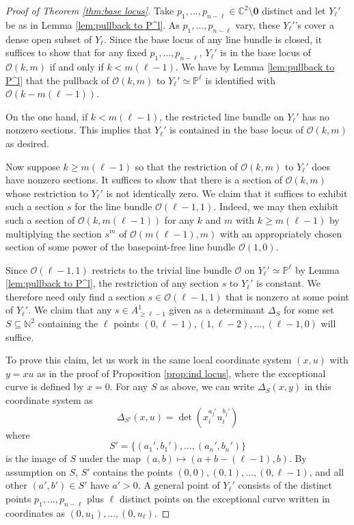 \documentclass[12pt]{amsart}
\newcommand{\C}{\mathbb{C}}
\newcommand{\N}{\mathbb{N}}
\renewcommand{\P}{\mathbb{P}}
\newcommand{\CO}{\mathcal{O}}
\numberwithin{equation}{section}
\theoremstyle{definition}
\begin{document}
\begin{proof}[Proof of Theorem \ref{thm:base locus}]
    
    
    Take $p_1,\dots,p_{n-\ell}\in \C^2\setminus \mathbf{0}$ distinct and let $Y_\ell'$ be as in Lemma \ref{lem:pullback to P^l}. As $p_1,\dots,p_{n-\ell}$ vary, these $Y_\ell'$'s cover a dense open subset of $Y_\ell$. Since the base locus of any line bundle is closed, it suffices to show that for any fixed $p_1,\dots,p_{n-\ell}$, $Y_\ell'$ is in the base locus of $\CO(k,m)$ if and only if $k<m(\ell-1)$. We have by Lemma \ref{lem:pullback to P^l} that the pullback of $\CO(k,m)$ to $Y_\ell'\simeq \P^\ell$ is identified with $\CO(k-m(\ell-1))$. 
    
    On the one hand, if $k<m(\ell-1)$, the restricted line bundle on $Y_\ell'$ has no nonzero sections. This implies that $Y_\ell'$ is contained in the base locus of $\CO(k,m)$ as desired.

    Now suppose $k\geq m(\ell-1)$ so that the restriction of $\CO(k,m)$ to $Y_\ell'$ does have nonzero sections. It suffices to show that there is a section of $\CO(k,m)$ whose restriction to $Y_\ell'$ is not identically zero. We claim that it suffices to exhibit such a section $s$ for the line bundle $\CO(\ell-1,1)$. Indeed, we may then exhibit such a section of $\CO(k,m(\ell-1))$ for any $k$ and $m$ with $k\geq m(\ell-1)$ by multiplying the section $s^m$ of $\CO(m(\ell-1),m)$ with an appropriately chosen section of some power of the basepoint-free line bundle $\CO(1,0)$.

    Since $\CO(\ell-1,1)$ restricts to the trivial line bundle $\CO$ on $Y_\ell'\simeq \P^\ell$ by Lemma \ref{lem:pullback to P^l}, the restriction of any section $s$ to $Y_\ell'$ is constant. We therefore need only find a section $s\in \CO(\ell-1,1)$ that is nonzero at some point of $Y_\ell'$. We claim that any  $s\in A^1_{\geq \ell-1}$ given as a determinant $\Delta_S$ for some set $S\subseteq \N^2$ containing the $\ell$ points $(0,\ell-1),(1,\ell-2),\dots,(\ell-1,0)$ will suffice. 

    To prove this claim, let us work in the same local coordinate system $(x,u)$ with $y=xu$ as in the proof of Proposition \ref{prop:ind locus}, where the exceptional curve is defined by $x=0$. For any $S$ as above, we can write $\Delta_S(x,y)$ in this coordinate system as
    \[\Delta_{S'}(x,u) = \det\left(x_i^{a_j'}u_i^{b_j'}\right) \]
    where 
    \[ S' = \{ (a_1',b_1'),\dots, (a_n',b_n') \}\]
    is the image of $S$ under the map $(a,b)\mapsto (a+b-(\ell-1),b)$. By assumption on $S$, $S'$ contains the points $(0,0),(0,1),\dots,(0,\ell-1)$, and all other $(a',b')\in S'$ have $a'>0$. 
    A general point of $Y_\ell'$ consists of the distinct points $p_1,\dots,p_{n-\ell}$ plus $\ell$ distinct points on the exceptional curve written in coordinates as $(0,u_1),\dots,(0,u_{\ell})$.
    

\end{proof}
\end{document}
